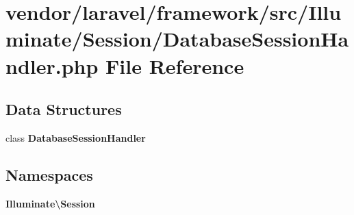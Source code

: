 \section{vendor/laravel/framework/src/\+Illuminate/\+Session/\+Database\+Session\+Handler.php File Reference}
\label{_database_session_handler_8php}
\subsection*{Data Structures}
\begin{DoxyCompactItemize}
\item 
class {\bf Database\+Session\+Handler}
\end{DoxyCompactItemize}
\subsection*{Namespaces}
\begin{DoxyCompactItemize}
\item 
 {\bf Illuminate\textbackslash{}\+Session}
\end{DoxyCompactItemize}
